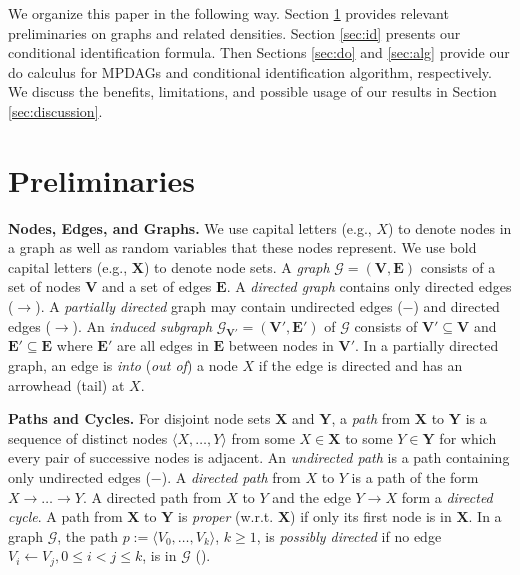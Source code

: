 \documentclass[11pt]{article}
\newcommand{\mb}[1]{\mathbf{#1}}
\newcommand{\g}[1][G]{\mathcal{#1}}
\begin{document}
We organize this paper in the following way. Section \ref{sec:prelims} provides relevant preliminaries on graphs and related densities. Section \ref{sec:id} presents our conditional identification formula. Then Sections \ref{sec:do} and \ref{sec:alg} provide our do calculus for MPDAGs and conditional identification algorithm, respectively. We discuss the benefits, limitations, and possible usage of our results in Section \ref{sec:discussion}.











\section{Preliminaries}
\label{sec:prelims}

\textbf{Nodes, Edges, and Graphs.}
We use capital letters (e.g., $X$) to denote nodes in a graph as well as random variables that these nodes represent. We use bold capital letters (e.g., $\mb{X}$) to denote node sets. A \textit{graph} $\g=(\mb{V},\mb{E})$ consists of a set of nodes $\mb{V}$ and a set of edges $\mb{E}$. A \emph{directed graph} contains only directed edges ($\to$). A \emph{partially directed} graph may contain undirected edges ($-$) and directed edges ($\to$). An \textit{induced subgraph} $\g_{\mb{V'}} =(\mb{V'}, \mb{E'})$ of $\g$ consists of $\mb{V'} \subseteq \mb{V}$ and $\mb{E'} \subseteq \mb{E}$ where $\mb{E'}$ are all edges in $\mb{E}$ between nodes in $\mb{V'}$. In a partially directed graph, an edge is \textit{into} (\textit{out of}) a node $X$ if the edge is directed and has an arrowhead (tail) at $X$.

\textbf{Paths and Cycles.}
For disjoint node sets $\mb{X}$ and $\mb{Y}$, a \textit{path} from $\mb{X}$ to $\mb{Y}$ is a sequence of distinct nodes $\langle X, \dots,Y \rangle$ from some $X \in \mb{X}$ to some $Y \in \mb{Y}$ for which every pair of successive nodes is adjacent. An \textit{undirected path} is a path containing only undirected edges ($-$). A \textit{directed path} from $X$ to $Y$ is a path of the form $X \to \dots\to Y$.  A directed path from $X$ to $Y$ and the edge $Y\to X$ form a \textit{directed cycle}. A path from $\mb{X}$ to $\mb{Y}$ is \textit{proper} (w.r.t. $\mb{X}$) if only its first node is in $\mb{X}$. In a graph $\g$, the  path $p := \langle V_0, \dots, V_k \rangle$, $k \geq 1$, is \textit{possibly directed} if no edge $V_i \gets V_j, 0 \le i < j \le k$, is in $\g$ (\citealp{perkovic2017interpreting}).
\end{document}
